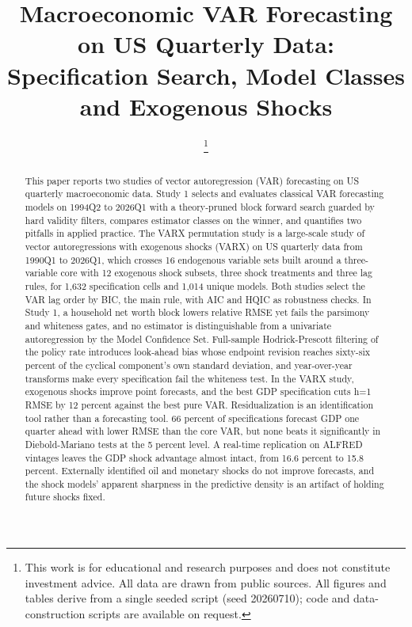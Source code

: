 \documentclass[conference]{IEEEtran}
\begin{document}
\title{Macroeconomic VAR Forecasting on US Quarterly Data:\\ Specification Search, Model Classes and Exogenous Shocks}

\author{
%
\thanks{This work is for educational and research purposes and does not constitute investment advice. All data are drawn from public sources. All figures and tables derive from a single seeded script (seed 20260710); code and data-construction scripts are available on request.}}

\maketitle

\begin{abstract}
This paper reports two studies of vector autoregression (VAR) forecasting on US quarterly macroeconomic data. Study 1 selects and evaluates classical VAR forecasting models on 1994Q2 to 2026Q1 with a theory-pruned block forward search guarded by hard validity filters, compares estimator classes on the winner, and quantifies two pitfalls in applied practice. The VARX permutation study is a large-scale study of vector autoregressions with exogenous shocks (VARX) on US quarterly data from 1990Q1 to 2026Q1, which crosses 16 endogenous variable sets built around a three-variable core with 12 exogenous shock subsets, three shock treatments and three lag rules, for 1,632 specification cells and 1,014 unique models. Both studies select the VAR lag order by BIC, the main rule, with AIC and HQIC as robustness checks. In Study 1, a household net worth block lowers relative RMSE yet fails the parsimony and whiteness gates, and no estimator is distinguishable from a univariate autoregression by the Model Confidence Set. Full-sample Hodrick-Prescott filtering of the policy rate introduces look-ahead bias whose endpoint revision reaches sixty-six percent of the cyclical component's own standard deviation, and year-over-year transforms make every specification fail the whiteness test. In the VARX study, exogenous shocks improve point forecasts, and the best GDP specification cuts h=1 RMSE by 12 percent against the best pure VAR. Residualization is an identification tool rather than a forecasting tool. 66 percent of specifications forecast GDP one quarter ahead with lower RMSE than the core VAR, but none beats it significantly in Diebold-Mariano tests at the 5 percent level. A real-time replication on ALFRED vintages leaves the GDP shock advantage almost intact, from 16.6 percent to 15.8 percent. Externally identified oil and monetary shocks do not improve forecasts, and the shock models' apparent sharpness in the predictive density is an artifact of holding future shocks fixed.
\end{abstract}
\end{document}
